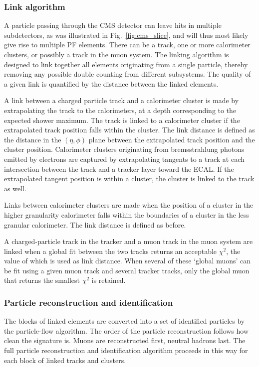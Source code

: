\subsubsection{Link algorithm}

A particle passing through the CMS detector can leave hits in multiple subdetectors, as was
illustrated in Fig.~\ref{fig:cms_slice}, and will thus most likely give rise to multiple PF
elements. There can be a track, one or more calorimeter clusters, or possibly a track in the muon
system. The linking algorithm is designed to link together all elements originating from a single
particle, thereby removing any possible double counting from different subsystems. The quality of a
given link is quantified by the distance between the linked elements. 

A link between a charged particle track and a calorimeter cluster is made by extrapolating the
track to the calorimeters, at a depth corresponding to the expected shower maximum. The track is
linked to a calorimeter cluster if the extrapolated track position falls within the cluster. The
link distance is defined as the distance in the $(\eta,\phi)$ plane between the extrapolated track
position and the cluster position.  
Calorimeter clusters originating from bremsstrahlung photons emitted by electrons are captured by
extrapolating tangents to a track at each intersection between the track and a tracker layer
toward the ECAL. If the extrapolated tangent position is within a cluster, the cluster is linked to
the track as well.

Links between calorimeter clusters are made when the position of a cluster in the higher granularity
calorimeter falls within the boundaries of a cluster in the less granular calorimeter. The link
distance is defined as before. 

A charged-particle track in the tracker and a muon track in the muon system are linked when a global
fit between the two tracks returns an acceptable $\chi^2$, the value of which is used as link
distance. When several of these `global muons' can be fit using a given muon track and several
tracker tracks, only the global muon that returns the smallest $\chi^2$ is retained. 


\subsubsection{Particle reconstruction and identification}

The blocks of linked elements are converted into a set of identified particles by the particle-flow
algorithm. The order of the particle reconstruction follows how clean the signature is. Muons are
reconstructed first, neutral hadrons last. The full particle reconstruction and identification
algorithm proceeds in this way for each block of linked tracks and clusters. 

